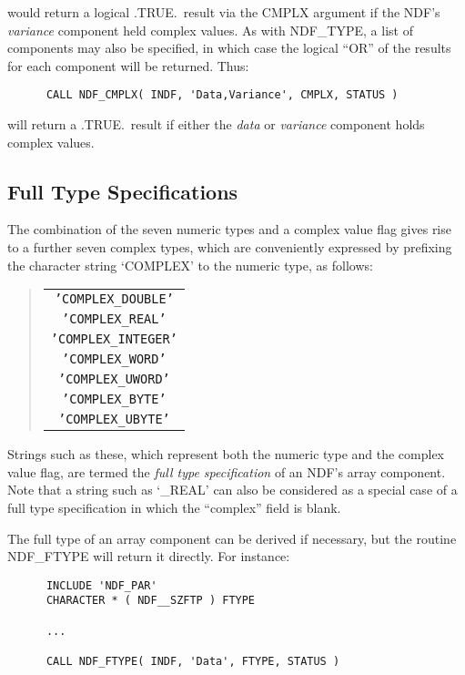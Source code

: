\documentclass[twoside,11pt]{article}
\newcommand{\htmlref}[2]{#1}
\newcommand{\xlabel}[1]{}
\newcommand{\st}[1]{{\em{#1}}}
\newcommand{\hi}[1]{{\tt{#1}}}
\begin{document}
would return a logical .TRUE.\ result via the CMPLX argument if the NDF's
\st{variance\/} component held complex values. 
As with \htmlref{NDF\_TYPE}{NDF_TYPE}, a list of components may also be specified, in which case
the logical ``OR'' of the results for each component will be returned. 
Thus:

\small
\begin{verbatim}
      CALL NDF_CMPLX( INDF, 'Data,Variance', CMPLX, STATUS )
\end{verbatim}
\normalsize

will return a .TRUE.\ result if either the \st{data\/} or \st{variance\/} component
holds complex values. 

\subsection{\xlabel{full_type_specifications}Full Type Specifications}

The combination of the seven numeric types and a complex value flag gives rise
to a further seven complex types, which are conveniently  expressed by prefixing
the character string `COMPLEX' to the numeric type, as follows:

\small
\begin{quote}
\begin{center}
\begin{tabular}{c}
\hi{'COMPLEX\_DOUBLE'}\\
\hi{'COMPLEX\_REAL'}\\
\hi{'COMPLEX\_INTEGER'}\\
\hi{'COMPLEX\_WORD'}\\
\hi{'COMPLEX\_UWORD'}\\
\hi{'COMPLEX\_BYTE'}\\
\hi{'COMPLEX\_UBYTE'}
\end{tabular}
\end{center}
\end{quote}
\normalsize

Strings such as these, which represent both the numeric type and the complex
value flag, are termed the \st{full type specification\/} of an NDF's array
component. 
Note that a string such as `\_REAL' can also be considered as a special case
of a full type specification in which the ``complex'' field is blank. 

The full type of an array component can be derived if necessary, but the
routine \htmlref{NDF\_FTYPE}{NDF_FTYPE} will return it directly. 
For instance:

\small
\begin{verbatim}
      INCLUDE 'NDF_PAR'
      CHARACTER * ( NDF__SZFTP ) FTYPE

      ...

      CALL NDF_FTYPE( INDF, 'Data', FTYPE, STATUS )
\end{verbatim}
\normalsize
\end{document}
